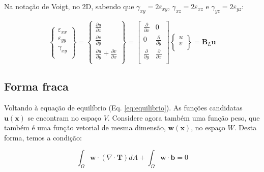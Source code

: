         Na notação de Voigt, no 2D, sabendo que $\gamma_{xy} = 2\varepsilon_{xy}$, $\gamma_{xz} = 2\varepsilon_{xz}$ e $\gamma_{yz} = 2\varepsilon_{yz}$:

        \begin{equation}
            \begin{Bmatrix}
                \varepsilon_{xx}\\
                \varepsilon_{yy}\\
                \gamma_{xy}\\
            \end{Bmatrix}
            =
            \begin{Bmatrix}
                \frac{\partial u}{\partial x}\\
                \frac{\partial v}{\partial y}\\
                \frac{\partial u}{\partial y} + \frac{\partial v}{\partial x}\\
            \end{Bmatrix}
            =
            \begin{bmatrix}
                \frac{\partial}{\partial x} & 0\\
                0 & \frac{\partial}{\partial y}\\
                \frac{\partial}{\partial y} & \frac{\partial}{\partial x}\\
            \end{bmatrix}
            \begin{Bmatrix}
                u\\
                v\\
            \end{Bmatrix}
            =
            \mathbf{B}_L
            \mathbf{u}
            \label{eq:voigt_deformacao}
        \end{equation}


    \subsection{Forma fraca}

        Voltando à equação de equilíbrio (Eq. \eqref{eq:equilibrio}). As funções candidatas $\mathbf{u}(\mathbf{x})$ se encontram no espaço $V$. Considere agora também uma função peso, que também é uma função vetorial de mesma dimensão, $\mathbf{w}(\mathbf{x})$, no espaço $W$. Desta forma, temos a condição:

        \begin{equation}
            \int_\Omega \mathbf{w} \cdot \left(\nabla \cdot \mathbf{T}\right)dA + \int_\Omega \mathbf{w} \cdot \mathbf{b} = 0
            \label{eq:elastico_fraca_part1}
        \end{equation}

